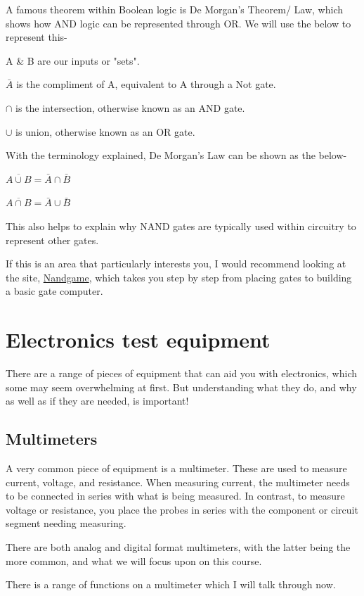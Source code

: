 \documentclass[a4paper,11pt]{report}
\begin{document}
A famous theorem within Boolean logic is De Morgan's Theorem/ Law, which shows how AND logic can be represented through OR. We will use the below to represent this-

A \& B are our inputs or "sets".

$\bar{A}$ is the compliment of A, equivalent to A through a Not gate.

$\cap$ is the intersection, otherwise known as an AND gate.

$\cup$ is union, otherwise known as an OR gate.

With the terminology explained, De Morgan's Law can be shown as the below-

$\overline{A\cup B} = \bar{A}\cap\bar{B}$

$\overline{A\cap B} = \bar{A}\cup\bar{B}$

This also helps to explain why NAND gates are typically used within circuitry to represent other gates.

If this is an area that particularly interests you, I would recommend looking at the site, \href{https://nandgame.com/}{Nandgame}, which takes you step by step from placing gates to building a basic gate computer.

\section{Electronics test equipment}

There are a range of pieces of equipment that can aid you with electronics, which some may seem overwhelming at first. But understanding what they do, and why as well as if they are needed, is important!

\subsection{Multimeters}

A very common piece of equipment is a multimeter. These are used to measure current, voltage, and resistance. When measuring current, the multimeter needs to be connected in series with what is being measured. In contrast, to measure voltage or resistance, you place the probes in series with the component or circuit segment needing measuring.

There are both analog and digital format multimeters, with the latter being the more common, and what we will focus upon on this course.

There is a range of functions on a multimeter which I will talk through now.
\end{document}
